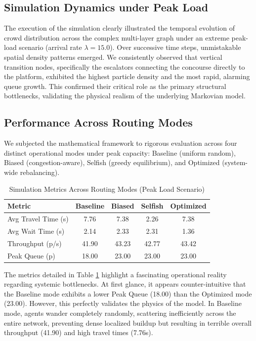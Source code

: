 \documentclass[conference]{IEEEtran}
\begin{document}
\subsection{Simulation Dynamics under Peak Load}
The execution of the simulation clearly illustrated the temporal evolution of crowd distribution across the complex multi-layer graph under an extreme peak-load scenario (arrival rate $\lambda = 15.0$). Over successive time steps, unmistakable spatial density patterns emerged. We consistently observed that vertical transition nodes, specifically the escalators connecting the concourse directly to the platform, exhibited the highest particle density and the most rapid, alarming queue growth. This confirmed their critical role as the primary structural bottlenecks, validating the physical realism of the underlying Markovian model.

\subsection{Performance Across Routing Modes}
We subjected the mathematical framework to rigorous evaluation across four distinct operational modes under peak capacity: Baseline (uniform random), Biased (congestion-aware), Selfish (greedy equilibrium), and Optimized (system-wide rebalancing).

\begin{table}[htbp]
\centering
\caption{Simulation Metrics Across Routing Modes (Peak Load Scenario)}
\label{tab:metrics_final}
\begin{tabular}{l c c c c}
\toprule
\textbf{Metric} & \textbf{Baseline} & \textbf{Biased} & \textbf{Selfish} & \textbf{Optimized} \\
\midrule
Avg Travel Time (s) & 7.76 & 7.38 & 2.26 & 7.38 \\
Avg Wait Time (s) & 2.14 & 2.33 & 2.31 & 1.36 \\
Throughput (p/s) & 41.90 & 43.23 & 42.77 & 43.42 \\
Peak Queue (p) & 18.00 & 23.00 & 23.00 & 23.00 \\
\bottomrule
\end{tabular}
\end{table}

The metrics detailed in Table \ref{tab:metrics_final} highlight a fascinating operational reality regarding systemic bottlenecks. At first glance, it appears counter-intuitive that the Baseline mode exhibits a lower Peak Queue (18.00) than the Optimized mode (23.00). However, this perfectly validates the physics of the model. In Baseline mode, agents wander completely randomly, scattering inefficiently across the entire network, preventing dense localized buildup but resulting in terrible overall throughput (41.90) and high travel times (7.76s). 
\end{document}
